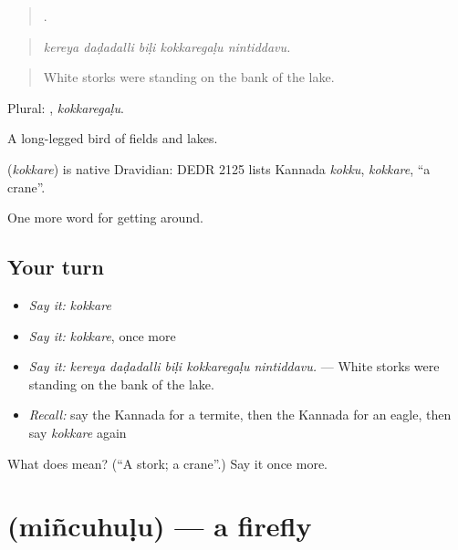 \begin{quote}
    .
\end{quote}

\begin{quote}
\emph{kereya daḍadalli biḷi kokkaregaḷu nintiddavu.}
\end{quote}

\begin{quote}
White storks were standing on the bank of the lake.
\end{quote}

Plural: , \emph{kokkaregaḷu}.

A long-legged bird of fields and lakes.

\begin{cousinweb}
\textbf{} (\emph{kokkare}) is native Dravidian: DEDR 2125 lists Kannada \emph{kokku}, \emph{kokkare}, \textquotedblleft{}a crane\textquotedblright{}.
\end{cousinweb}

\begin{grammarlens}[title={What you've built}]
One more word for getting around.
\end{grammarlens}

\subsection*{Your turn}
\begin{itemize}
\raggedright
  \item \emph{Say it:} \emph{kokkare}
  \item \emph{Say it:} \emph{kokkare}, once more
  \item \emph{Say it:} \emph{kereya daḍadalli biḷi kokkaregaḷu nintiddavu.} — White storks were standing on the bank of the lake.
  \item \emph{Recall:} say the Kannada for a termite, then the Kannada for an eagle, then say \emph{kokkare} again
\end{itemize}

\begin{tcolorbox}[breakable,colback=teal!4,colframe=teal!35!black,title={Before you move on}]
What does  mean? (\textquotedblleft{}A stork; a crane\textquotedblright{}.) Say it once more.
\end{tcolorbox}
\section[\texorpdfstring{\kn{ಮಿಂಚುಹುಳು} (miñcuhuḷu)}{ಮಿಂಚುಹುಳು (miñcuhuḷu)}]{ (miñcuhuḷu) — a firefly}

